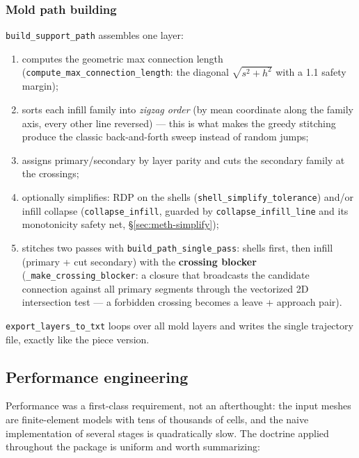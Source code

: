 \subsubsection{Mold path building}

\texttt{build\_support\_path} assembles one layer:

\begin{enumerate}
  \item computes the geometric max connection length
        (\texttt{compute\_max\_connection\_length}: the diagonal
        $\sqrt{s^2 + h^2}$ with a 1.1 safety margin);
  \item sorts each infill family into \emph{zigzag order}
        (by mean coordinate along the family axis, every other line
        reversed) --- this is what makes the greedy stitching produce
        the classic back-and-forth sweep instead of random jumps;
  \item assigns primary/secondary by layer parity and cuts the
        secondary family at the crossings;
  \item optionally simplifies: RDP on the shells
        (\texttt{shell\_simplify\_tolerance}) and/or infill collapse
        (\texttt{collapse\_infill}, guarded by
        \texttt{collapse\_infill\_line} and its monotonicity safety
        net, \S\ref{sec:meth-simplify});
  \item stitches two passes with \texttt{build\_path\_single\_pass}:
        shells first, then infill (primary + cut secondary) with the
        \textbf{crossing blocker}
        (\texttt{\_make\_crossing\_blocker}: a closure that broadcasts
        the candidate connection against all primary segments through
        the vectorized 2D intersection test --- a forbidden crossing
        becomes a leave + approach pair).
\end{enumerate}

\texttt{export\_layers\_to\_txt} loops over all mold layers and writes
the single trajectory file, exactly like the piece version.

\subsection{Performance engineering}\label{sec:impl-perf}

Performance was a first-class requirement, not an afterthought: the
input meshes are finite-element models with tens of thousands of cells,
and the naive implementation of several stages is quadratically slow.
The doctrine applied throughout the package is uniform and worth
summarizing:

